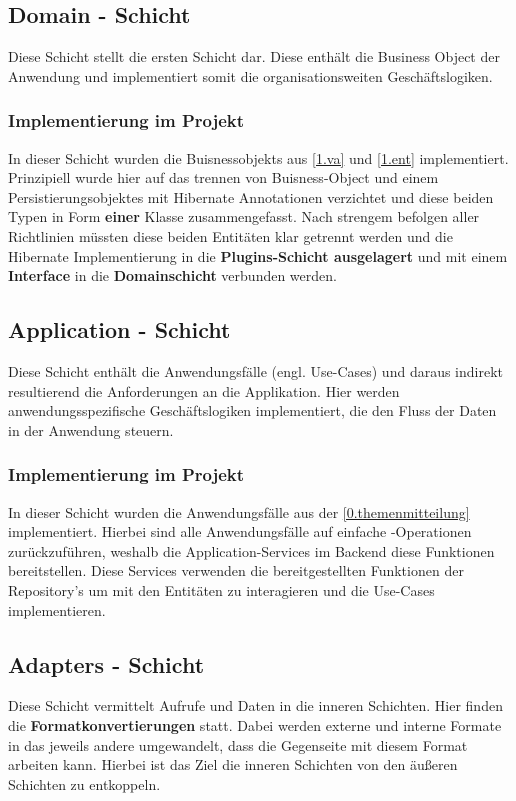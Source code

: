 		\subsection{Domain - Schicht} \label{2.domain}
		Diese Schicht stellt die ersten  Schicht dar. Diese enthält die Business Object der Anwendung und implementiert somit die organisationsweiten Geschäftslogiken. 
			\subsubsection{Implementierung im Projekt}
			In dieser Schicht wurden die Buisnessobjekts aus \cref{1.va} und \cref{1.ent} implementiert. Prinzipiell wurde hier auf das trennen von Buisness-Object und einem Persistierungsobjektes mit Hibernate Annotationen verzichtet und diese beiden Typen in Form \textbf{einer} Klasse zusammengefasst. Nach strengem befolgen aller Richtlinien müssten diese beiden Entitäten klar getrennt werden und die Hibernate Implementierung in die \textbf{Plugins-Schicht ausgelagert} und mit einem \textbf{Interface} in die\textbf{ Domainschicht} verbunden werden.
		
		\subsection{Application - Schicht}
		Diese Schicht enthält die Anwendungsfälle (engl. Use-Cases) und daraus indirekt resultierend die Anforderungen an die Applikation. Hier werden anwendungsspezifische Geschäftslogiken implementiert, die den Fluss der Daten in der Anwendung steuern. 
			\subsubsection{Implementierung im Projekt}
			In dieser Schicht wurden die Anwendungsfälle aus der \cref{0.themenmitteilung} implementiert. Hierbei sind alle Anwendungsfälle auf einfache -Operationen zurückzuführen, weshalb die Application-Services im Backend diese Funktionen bereitstellen. Diese Services verwenden die bereitgestellten Funktionen der Repository's um mit den Entitäten zu interagieren und die Use-Cases implementieren.
			
		\subsection{Adapters - Schicht}
		Diese Schicht vermittelt Aufrufe und Daten in die inneren Schichten. Hier finden die \textbf{Formatkonvertierungen} statt. Dabei werden externe und interne Formate in das jeweils andere umgewandelt, dass die Gegenseite mit diesem Format arbeiten kann. Hierbei ist das Ziel die inneren Schichten von den äußeren Schichten zu entkoppeln.
